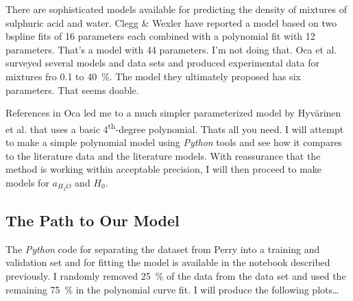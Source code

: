 \documentclass[]{tufte-handout}
\newcommand{\tss}[1]{\textsuperscript{#1}}
\begin{document}
There are sophisticated models available for predicting the density of mixtures of sulphuric acid and water. Clegg \& Wexler have reported a model based on two bspline fits of 16 parameters each combined with a polynomial fit with 12 parameters. That's a model with 44 parameters. I'm not doing that. Oca et al. surveyed several models and data sets and produced experimental data for  mixtures fro \num{0.1} to \qty{40}{\percent}. The model they ultimately proposed has six parameters. That seems doable. 




References in Oca led me to a much simpler parameterized model by Hyvärinen et al. that uses a basic 4\tss{th}-degree polynomial. Thats all you need. I will attempt to make a simple polynomial model using \textit{Python} tools and see how it compares to the literature data and the literature models. With reassurance that the method is working within acceptable precision, I will then proceed to make models for $a_{H_2O}$ and $H_0$.

\newpage
 \subsection{The Path to Our Model}
 
 The \textit{Python} code for separating the dataset from Perry into a training and validation set and for fitting the model is available in the notebook described previously. I randomly removed \qty{25}{\percent} of the data from the data set and used the remaining \qty{75}{\percent} in the polynomial curve fit. I will produce the following plots\ldots
 
\end{document}
